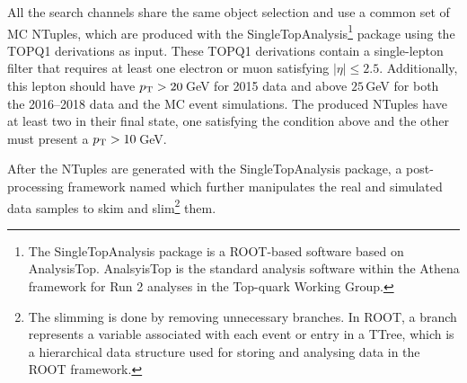 All the search channels share the same object selection and use a common set of MC NTuples, which 
are produced with the SingleTopAnalysis\footnote{The SingleTopAnalysis package is
a ROOT-based software based on AnalysisTop. %
AnalsyisTop is the standard analysis software within the Athena framework for Run 2 analyses 
in the Top-quark Working Group.} package using the TOPQ1 derivations %
as input. These TOPQ1 derivations contain a single-lepton filter 
that requires at least one electron or muon satisfying $|\eta| \leq 2.5$. %
Additionally, this lepton should have $p_{\text{T}} >20\,$GeV for 2015 data and above $25\,$GeV 
for both the 2016--2018 data and the MC event simulations.
The produced NTuples have at least two \emu in their final state, one satisfying the condition above and
the other must present a  $p_{\text{T}} >10\,$GeV. %

After the NTuples are generated with the SingleTopAnalysis package, a post-processing framework named \thqloop 
which further manipulates the real and simulated data samples to skim and slim\footnote{The slimming is done by removing 
unnecessary branches. In ROOT, a branch represents a variable associated with each event or entry in a TTree, which is a hierarchical data structure used for storing and analysing data in the ROOT framework.} them. 


